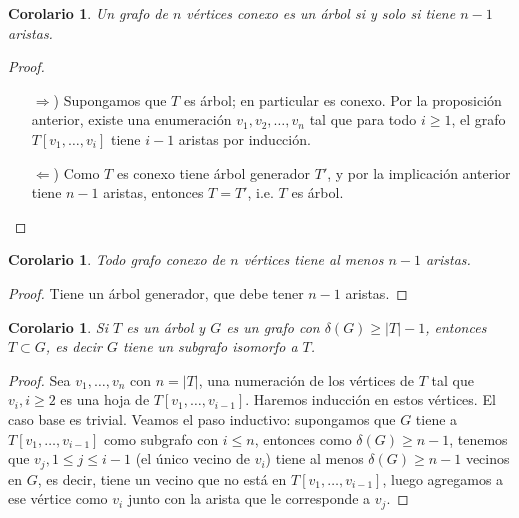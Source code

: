 \documentclass[12pt]{report}
\theoremstyle{plain}
\newtheorem{corollary}[theorem]{Corolario}
\theoremstyle{definition}
\newcommand{\abs}[1]{\left \vert #1 \right \vert}
\begin{document}


\begin{corollary}\label{corolario:todo grafo conexo de n vertices es un arbol si y solo si tiene n-1 aristas}
Un grafo de $n$ vértices conexo es un árbol si y solo si tiene $n-1$ aristas.
\end{corollary}
\begin{proof}
\begin{enumerate}
\item[$\Rightarrow$)] Supongamos que $T$ es árbol; en particular es conexo. Por la proposición anterior, existe una enumeración $v_1,v_2,\ldots,v_n$ tal que para todo $i \geq 1$, el grafo $T[v_1,\ldots, v_i]$ tiene $i-1$ aristas por inducción.

\item[$\Leftarrow$)] Como $T$ es conexo tiene árbol generador $T'$, y por la implicación anterior tiene $n-1$ aristas, entonces $T = T'$, i.e. $T$ es árbol.
\end{enumerate}
\end{proof}

\begin{corollary}
Todo grafo conexo de $n$ vértices tiene al menos $n-1$ aristas.
\end{corollary}
\begin{proof}
Tiene un árbol generador, que debe tener $n-1$ aristas.
\end{proof}

\begin{corollary}
Si $T$ es un árbol y $G$ es un grafo con $\delta (G) \geq \abs T -1$, entonces $T \subset G$, es decir $G$ tiene un subgrafo isomorfo a $T$.
\end{corollary}
\begin{proof}
Sea $v_1,\ldots,v_n$ con $n = \abs T$, una numeración de los vértices de $T$ tal que $v_i, i \geq 2$ es una hoja de $T[v_1,\ldots,v_{i-1}]$. Haremos inducción en estos vértices. El caso base es trivial. Veamos el paso inductivo: supongamos que $G$ tiene a $T[v_1,\ldots,v_{i-1}]$ como subgrafo con $i\leq n$, entonces como $\delta (G) \geq n-1$, tenemos que $v_j, 1 \leq j \leq i-1$ (el único vecino de $v_i$) tiene al menos $\delta(G) \geq n-1$ vecinos en $G$, es decir, tiene un vecino que no está en $T[v_1,\ldots, v_{i-1}]$, luego agregamos a ese vértice como $v_i$ junto con la arista que le corresponde a $v_j$.
\end{proof}
\end{document}
